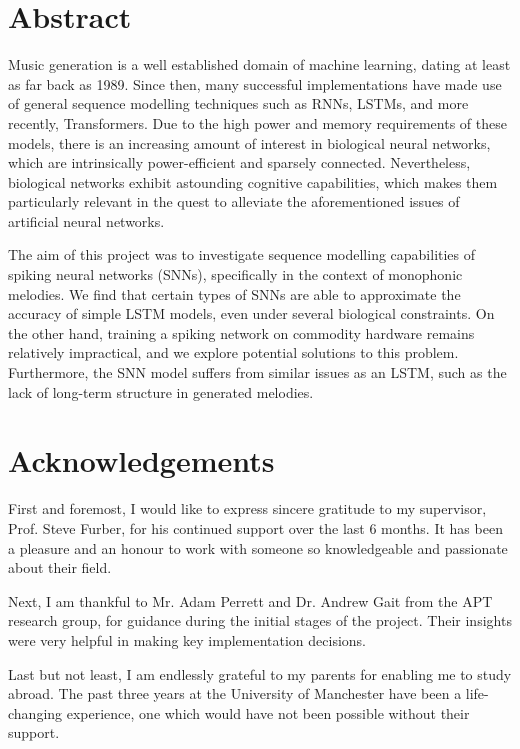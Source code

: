 \documentclass[../report.tex]{subfiles}
\begin{document}
\section*{Abstract}

Music generation is a well established domain of machine learning, dating at
least as far back as 1989. Since then, many successful implementations have made
use of general sequence modelling techniques such as RNNs, LSTMs, and more
recently, Transformers. Due to the high power and memory requirements of these
models, there is an increasing amount of interest in biological neural networks,
which are intrinsically power-efficient and sparsely connected. Nevertheless,
biological networks exhibit astounding cognitive capabilities, which makes them
particularly relevant in the quest to alleviate the aforementioned issues of
artificial neural networks.

The aim of this project was to investigate sequence modelling capabilities of
spiking neural networks (SNNs), specifically in the context of monophonic
melodies. We find that certain types of SNNs are able to approximate the
accuracy of simple LSTM models, even under several biological constraints. On
the other hand, training a spiking network on commodity hardware remains
relatively impractical, and we explore potential solutions to this problem.
Furthermore, the SNN model suffers from similar issues as an LSTM, such as the
lack of long-term structure in generated melodies.

\section*{Acknowledgements}

First and foremost, I would like to express sincere gratitude to my supervisor,
Prof. Steve Furber, for his continued support over the last 6 months. It has
been a pleasure and an honour to work with someone so knowledgeable and
passionate about their field.

Next, I am thankful to Mr. Adam Perrett and Dr. Andrew Gait from the APT
research group, for guidance during the initial stages of the project. Their
insights were very helpful in making key implementation decisions.

Last but not least, I am endlessly grateful to my parents for enabling me to
study abroad. The past three years at the University of Manchester have been a
life-changing experience, one which would have not been possible without their
support.
\end{document}
